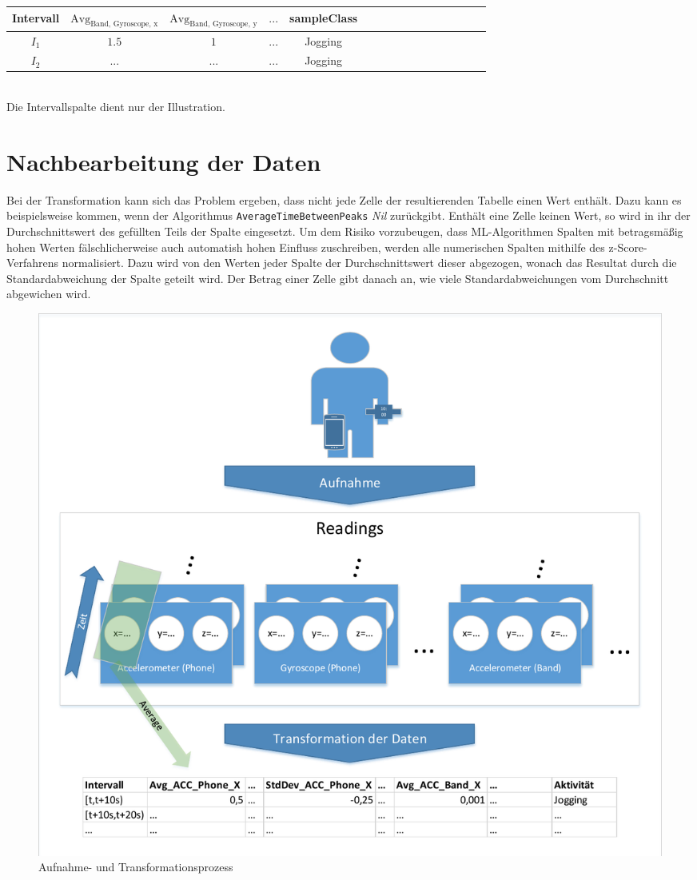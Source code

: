 \begin{tabular}{|c|c|c|c|c|c|c|c|c|c|c|c|c|c|c|c|}
	\hline 
	Intervall & $\text{Avg}_\text{Band, Gyroscope, x}$ & $\text{Avg}_\text{Band, Gyroscope, y}$  & $...$  & sampleClass  \\ 
	\hline 
	$I_1$ & $1.5$ & $1$ & $...$ & Jogging \\ 
	\hline 
	$I_2$ & $...$ & $...$ & $...$ & Jogging   \\ 
	\hline 
\end{tabular} \\

Die Intervallspalte dient nur der Illustration.

\section{Nachbearbeitung der Daten}
Bei der Transformation kann sich das Problem ergeben, dass nicht jede Zelle der resultierenden Tabelle einen Wert enthält. Dazu kann es beispielsweise kommen, wenn der Algorithmus \texttt{AverageTimeBetweenPeaks} \textit{Nil} zurückgibt. Enthält eine Zelle keinen Wert, so wird in ihr der Durchschnittswert des gefüllten Teils der Spalte eingesetzt. Um dem Risiko vorzubeugen, dass ML-Algorithmen Spalten mit betragsmäßig hohen Werten fälschlicherweise auch automatish hohen Einfluss zuschreiben, werden alle numerischen Spalten mithilfe des z-Score-Verfahrens normalisiert. Dazu wird von den Werten jeder Spalte der Durchschnittswert dieser abgezogen, wonach das Resultat durch die Standardabweichung der Spalte geteilt wird. Der Betrag einer Zelle gibt danach an, wie viele Standardabweichungen vom Durchschnitt abgewichen wird.

\begin{figure}
\centering
\includegraphics[width=\textwidth,clip,trim=5mm 5mm 5mm 5mm]{img/transformation}
\caption{Aufnahme- und Transformationsprozess}
\label{fig:recording-and-transformation}
\end{figure}


